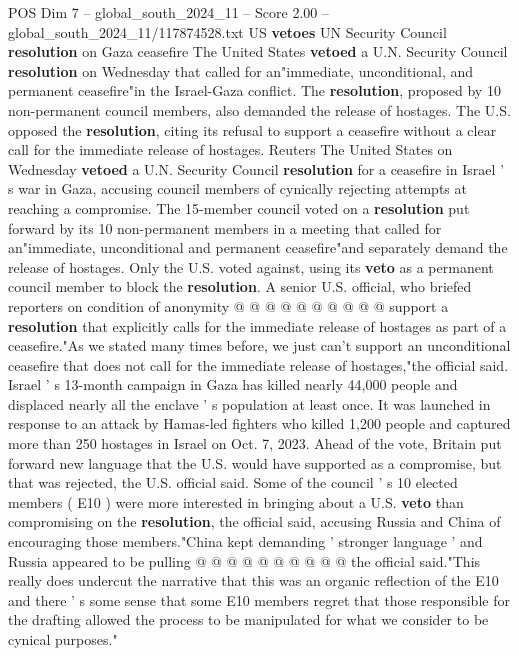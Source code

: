 \begin{textsample}{POS Dim 7 – global\_south\_2024\_11 – Score 2.00 – global\_south\_2024\_11/117874528.txt}  \label{ex:f7_pos_018}
US \textbf{vetoes} UN Security Council \textbf{resolution} on Gaza ceasefire The United States \textbf{vetoed} a U.N.
Security Council \textbf{resolution} on Wednesday that called for an"immediate, unconditional, and permanent ceasefire"in the Israel-Gaza conflict.
The \textbf{resolution}, proposed by 10 non-permanent council members, also demanded the release of hostages.
The U.S. opposed the \textbf{resolution}, citing its refusal to support a ceasefire without a clear call for the immediate release of hostages.
Reuters The United States on Wednesday \textbf{vetoed} a U.N.
Security Council \textbf{resolution} for a ceasefire in Israel ' s war in Gaza, accusing council members of cynically rejecting attempts at reaching a compromise.
The 15-member council voted on a \textbf{resolution} put forward by its 10 non-permanent members in a meeting that called for an"immediate, unconditional and permanent ceasefire"and separately demand the release of hostages.
Only the U.S. voted against, using its \textbf{veto} as a permanent council member to block the \textbf{resolution}.
A senior U.S. official, who briefed reporters on condition of anonymity @ @ @ @ @ @ @ @ @ @ support a \textbf{resolution} that explicitly calls for the immediate release of hostages as part of a ceasefire."As we stated many times before, we just can't support an unconditional ceasefire that does not call for the immediate release of hostages,"the official said.
Israel ' s 13-month campaign in Gaza has killed nearly 44,000 people and displaced nearly all the enclave ' s population at least once.
It was launched in response to an attack by Hamas-led fighters who killed 1,200 people and captured more than 250 hostages in Israel on Oct. 7, 2023.
Ahead of the vote, Britain put forward new language that the U.S. would have supported as a compromise, but that was rejected, the U.S. official said.
Some of the council ' s 10 elected members ( E10 ) were more interested in bringing about a U.S. \textbf{veto} than compromising on the \textbf{resolution}, the official said, accusing Russia and China of encouraging those members."China kept demanding ' stronger language ' and Russia appeared to be pulling @ @ @ @ @ @ @ @ @ @ the official said."This really does undercut the narrative that this was an organic reflection of the E10 and there ' s some sense that some E10 members regret that those responsible for the drafting allowed the process to be manipulated for what we consider to be cynical purposes."

\end{textsample}
